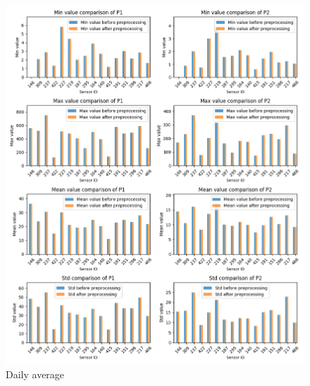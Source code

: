 \documentclass[12pt,a4paper,twoside]{scrartcl}
\numberwithin{equation}{section}
\newcounter{mypagecount}%
\newenvironment{interlude}{%
  \clearpage
  \setcounter{mypagecount}{\value{page}}%
  \thispagestyle{empty}%
  \pagestyle{empty}%
  }{%
  \clearpage
  \setcounter{page}{\value{mypagecount}}%
  }
\begin{document}
\begin{interlude}
\begin{appendices}
\begin{center}
      \begin{figure}[H]
        \centerline{\includegraphics[width=1.1\textwidth,height=1.3\textwidth]{figures/1D_sensor_metrics}}
        \caption[Metrics change during preprocessing (one day average)]{Daily average}
      \end{figure}


\end{center}
\end{appendices}
\end{interlude}
\end{document}
